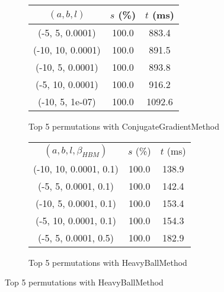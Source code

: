 \begin{figure}[H]
{\begin{subfigure}[ht]{.6\textwidth}
\begin{tabular}{|c|c|c|}
\hline
\rowcolor{gray!25}
$(a,b,l)$ & $s$ (\%) & $t$ (ms) \\
\hline
(-5, 5, 0.0001) & 100.0 & 883.4 \\
(-10, 10, 0.0001) & 100.0 & 891.5 \\
(-10, 5, 0.0001) & 100.0 & 893.8 \\
(-5, 10, 0.0001) & 100.0 & 916.2 \\
(-10, 5, 1e-07) & 100.0 & 1092.6 \\
\hline
\end{tabular}
\caption{Top 5 permutations with ConjugateGradientMethod}
\label{subfig:param_comp_NegativeEntropy_ConjugateGradientMethod_BisectionSearch}
\end{subfigure}
\hfill
\begin{subfigure}[ht]{.6\textwidth}
\centering
{}
\begin{tabular}{|c|c|c|}
\hline
\rowcolor{gray!25}
\multicolumn{3}{|c|}{HeavyBallMethod} \\
\hline
\rowcolor{gray!25}
$(a,b,l,\beta_{HBM})$ & $s$ (\%) & $t$ (ms) \\
\hline
(-10, 10, 0.0001, 0.1) & 100.0 & 138.9 \\
(-5, 5, 0.0001, 0.1) & 100.0 & 142.4 \\
(-10, 5, 0.0001, 0.1) & 100.0 & 153.4 \\
(-5, 10, 0.0001, 0.1) & 100.0 & 154.3 \\
(-5, 5, 0.0001, 0.5) & 100.0 & 182.9 \\
\hline
\end{tabular}
\caption{Top 5 permutations with HeavyBallMethod}
\label{subfig:param_comp_NegativeEntropy_HeavyBallMethod_BisectionSearch}
\end{subfigure}
}
\end{figure}